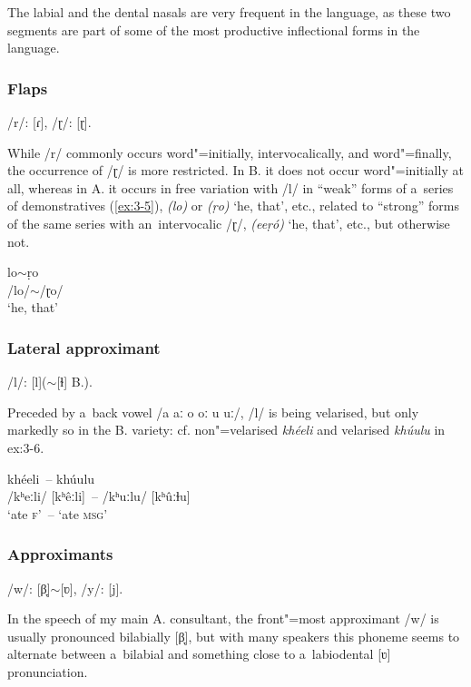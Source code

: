 The labial and the dental nasals are very frequent in the language, as these two segments are part of some of the most productive inflectional forms in the language.

\subsubsection*{Flaps}

/r/: [ɾ], /ɽ/: [ɽ].


While /r/ commonly occurs word"=initially, intervocalically, and word"=finally, the occurrence of /ɽ/
is more restricted. In B. it does not occur word"=initially at all, whereas in A. it occurs in free
variation with /l/ in ``weak'' forms of a~series of demonstratives (\ref{ex:3-5}), \textit{(lo)} or
\textit{(ṛo)} `he, that', etc., related to ``strong'' forms of the same series with an~intervocalic
/ɽ/, \textit{(eeṛó)} `he, that', etc., but otherwise not.

\begin{exe}
\ex
\label{ex:3-5}
\gll lo$\sim${}ṛo \\
/lo/$\sim${}/ɽo/ \\
\glt `he, that' 
\end{exe}

\subsubsection*{Lateral approximant}

/l/: [l]($\sim$[ɫ] B.).


Preceded by a~back vowel /a aː o oː u uː/, /l/ is being velarised, but only markedly so in the B. variety: cf. non"=velarised \textit{khéeli} and velarised \textit{khúulu} in {ex:3-6}.

\begin{exe}
\ex
\label{ex:3-6}
\gll khéeli~-- khúulu \\
/kʰeːli/ [kʰêːli]~-- /kʰuːlu/ [kʰûːɫu] \\ 
\glt `ate \textsc{f}'~-- `ate \textsc{msg}'
\end{exe}

\subsubsection*{Approximants}

/w/: [β̞]$\sim$[ʋ], /y/: [j].


In the speech of my main A. consultant, the front"=most approximant /w/ is usually pronounced bilabially [β̞], but with many speakers this phoneme seems to alternate between a~bilabial and something close to a~labiodental [ʋ] pronunciation.


